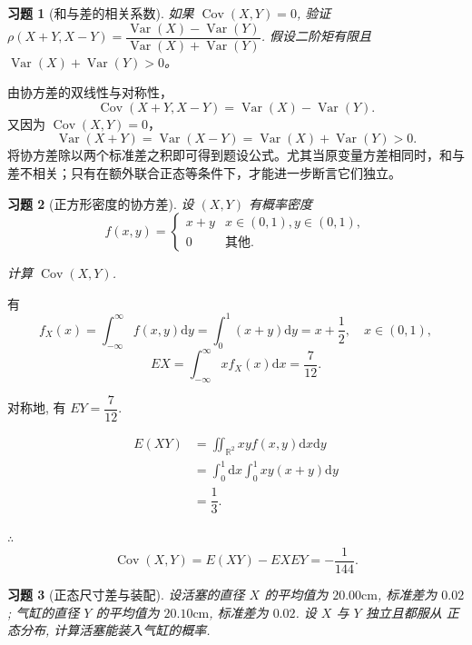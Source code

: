 \documentclass[UTF8,12pt,a4paper,fontset=fandol]{ctexart}
\newtheorem{exercise}{习题}[section]
\begin{document}
\begin{exercise}[和与差的相关系数]\label{q:A5.26}
如果 $\operatorname{Cov}(X,Y)=0$, 验证 $\rho(X+Y,X-Y)=\dfrac{\operatorname{Var}(X)-\operatorname{Var}(Y)}{\operatorname{Var}(X)+\operatorname{Var}(Y)}$. 假设二阶矩有限且 $\operatorname{Var}(X)+\operatorname{Var}(Y)>0$。\par{}
\end{exercise}

\begin{solve}\label{a:A5.26}由协方差的双线性与对称性，\[\operatorname{Cov}(X+Y,X-Y)=\operatorname{Var}(X)-\operatorname{Var}(Y).\]又因为 $\operatorname{Cov}(X,Y)=0$，\[\operatorname{Var}(X+Y)=\operatorname{Var}(X-Y)=\operatorname{Var}(X)+\operatorname{Var}(Y)>0.\]将协方差除以两个标准差之积即可得到题设公式。尤其当原变量方差相同时，和与差不相关；只有在额外联合正态等条件下，才能进一步断言它们独立。\end{solve}

\begin{exercise}[正方形密度的协方差]\label{q:A5.28}
设 $(X,Y)$ 有概率密度
    \[f(x,y)=\begin{cases}
        x+y & x\in(0,1),y\in(0,1), \\
        0 & \text{其他}.
    \end{cases}\]

    计算 $\operatorname{Cov}(X,Y)$.\par{}
\end{exercise}

\begin{solve}\label{a:A5.28}
    有
    \[f_X(x)=\int_{-\infty}^\infty f(x,y)\mathrm{d}y=\int_0^1(x+y)\mathrm{d}y=x+\dfrac{1}{2},\quad x\in(0,1),\]
    \[EX=\int_{-\infty}^\infty xf_X(x)\mathrm{d}x=\dfrac{7}{12}.\]

    对称地, 有 $EY=\dfrac{7}{12}$.

    \[\begin{aligned}E(XY)&=\iint_{\mathbb{R}^2}xyf(x,y)\mathrm{d}x\mathrm{d}y\\&=\int_0^1\mathrm{d}x\int_0^1xy(x+y)\mathrm{d}y\\&=\dfrac{1}{3}.\end{aligned}\]

    $\therefore$
    \[\operatorname{Cov}(X,Y)=E(XY)-EXEY=-\dfrac{1}{144}.\]
\end{solve}

\begin{exercise}[正态尺寸差与装配]\label{q:A5.30}
设活塞的直径 $X$ 的平均值为 $20.00\text{cm}$, 标准差为 $0.02$; 气缸的直径 $Y$ 的平均值为 $20.10\text{cm}$, 标准差为 $0.02$. 设 $X$ 与 $Y$ 独立且都服从 正态分布, 计算活塞能装入气缸的概率.\par{}
\end{exercise}
\end{document}
